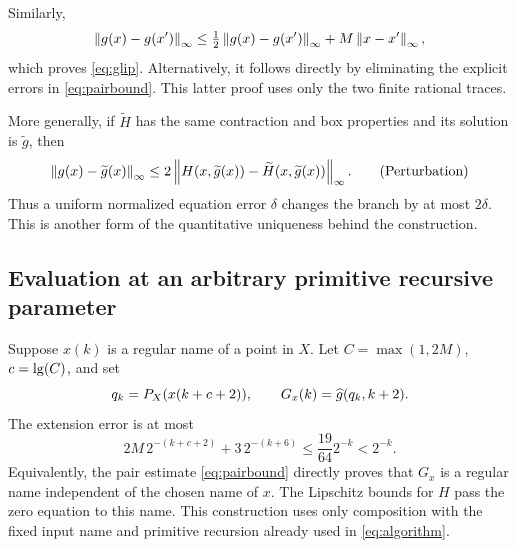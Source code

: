 Similarly,
\[
 \left\lVert g(x)-g(x')\right\rVert_\infty
 \le\tfrac12\left\lVert g(x)-g(x')\right\rVert_\infty+M\left\lVert x-x'\right\rVert_\infty,
\]
which proves \eqref{eq:glip}. Alternatively, it follows directly
by eliminating the explicit errors in \eqref{eq:pairbound}.
This latter proof uses only the two finite rational traces.

More generally, if \(\widetilde H\) has the same contraction and
box properties and its solution is \(\widetilde g\), then
\[
 \left\lVert g(x)-\widetilde g(x)\right\rVert_\infty
 \le 2\left\lVert H(x,\widetilde g(x))-\widetilde H(x,\widetilde g(x))\right\rVert_\infty.
 \tag{Perturbation}
\]
Thus a uniform normalized equation error \(\delta\) changes the
branch by at most \(2\delta\). This is another form of the
quantitative uniqueness behind the construction.

\subsection{Evaluation at an arbitrary primitive recursive parameter}

Suppose \(x(k)\) is a regular name of a point in \(X\).
Let \(C=\max(1,2M)\), \(c=\operatorname{lg}(C)\), and set
\[
 q_k=P_X(x(k+c+2)),\qquad
 G_x(k)=\widehat g(q_k,k+2).
\]
The extension error is at most
\[
 2M\,2^{-(k+c+2)}+3\,2^{-(k+6)}
 \le \frac{19}{64}2^{-k}<2^{-k}.
\]
Equivalently, the pair estimate \eqref{eq:pairbound} directly
proves that \(G_x\) is a regular name independent of the chosen
name of \(x\). The Lipschitz bounds for \(H\) pass the zero
equation to this name. This construction uses only composition
with the fixed input name and primitive recursion already used
in \eqref{eq:algorithm}.
